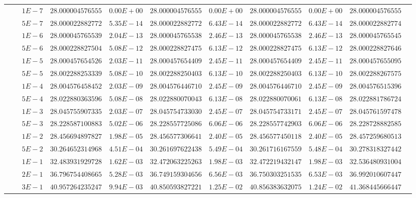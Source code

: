 \begin{landscape}
\begin{table}[ht]
{\begin{tabular}[c]{c|c|c|c|c|c|c|c|c|c|c}
& &$1E-7$ & $28.000004576555$ & $0.00E+00$ & $28.000004576555$ & $0.00E+00$ & $28.000004576555$ & $0.00E+00$ & $28.000004576555$ &  \\
& &$5E-7$ & $28.000022882772$ & $5.35E-14$ & $28.000022882772$ & $6.43E-14$ & $28.000022882772$ & $6.43E-14$ & $28.000022882774$ &  \\
& &$1E-6$ & $28.000045765539$ & $2.04E-13$ & $28.000045765538$ & $2.46E-13$ & $28.000045765538$ & $2.46E-13$ & $28.000045765545$ &  \\
& &$5E-6$ & $28.000228827504$ & $5.08E-12$ & $28.000228827475$ & $6.13E-12$ & $28.000228827475$ & $6.13E-12$ & $28.000228827646$ &  \\
& &$1E-5$ & $28.000457654526$ & $2.03E-11$ & $28.000457654409$ & $2.45E-11$ & $28.000457654409$ & $2.45E-11$ & $28.000457655095$ &  \\
& &$5E-5$ & $28.002288253339$ & $5.08E-10$ & $28.002288250403$ & $6.13E-10$ & $28.002288250403$ & $6.13E-10$ & $28.002288267575$ &  \\
& &$1E-4$ & $28.004576458452$ & $2.03E-09$ & $28.004576446710$ & $2.45E-09$ & $28.004576446710$ & $2.45E-09$ & $28.004576515396$ &  \\
& &$5E-4$ & $28.022880363596$ & $5.08E-08$ & $28.022880070043$ & $6.13E-08$ & $28.022880070061$ & $6.13E-08$ & $28.022881786724$ &  \\
& &$1E-3$ & $28.045755907335$ & $2.03E-07$ & $28.045754733030$ & $2.45E-07$ & $28.045754733171$ & $2.45E-07$ & $28.045761597478$ &  \\
& &$5E-3$ & $28.228587100883$ & $5.02E-06$ & $28.228557725086$ & $6.06E-06$ & $28.228557742903$ & $6.06E-06$ & $28.228728882585$ &  \\
& &$1E-2$ & $28.456694897827$ & $1.98E-05$ & $28.456577306641$ & $2.40E-05$ & $28.456577450118$ & $2.40E-05$ & $28.457259680513$ &  \\
& &$5E-2$ & $30.264652314968$ & $4.51E-04$ & $30.261697622438$ & $5.49E-04$ & $30.261716167559$ & $5.48E-04$ & $30.278318327442$ &  \\
& &$1E-1$ & $32.483931929728$ & $1.62E-03$ & $32.472063225263$ & $1.98E-03$ & $32.472219432147$ & $1.98E-03$ & $32.536480931004$ &  \\
& &$2E-1$ & $36.796754408665$ & $5.28E-03$ & $36.749159304656$ & $6.56E-03$ & $36.750303251535$ & $6.53E-03$ & $36.992010607447$ &  \\
& &$3E-1$ & $40.957264235247$ & $9.94E-03$ & $40.850593827221$ & $1.25E-02$ & $40.856383632075$ & $1.24E-02$ & $41.368445666447$ &  \\

\end{tabular}}
\end{table}
\end{landscape}
